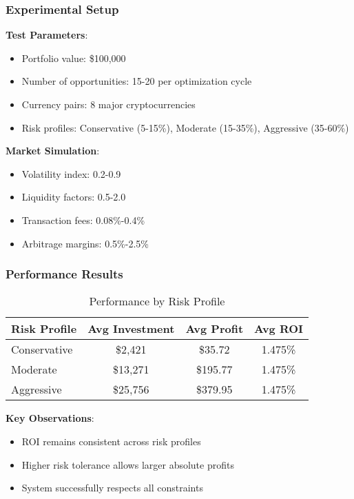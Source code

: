 \documentclass{beamer}
\begin{document}
\begin{frame}
\frametitle{Experimental Setup}
\textbf{Test Parameters}:
\begin{itemize}
    \item Portfolio value: \$100,000
    \item Number of opportunities: 15-20 per optimization cycle
    \item Currency pairs: 8 major cryptocurrencies
    \item Risk profiles: Conservative (5-15\%), Moderate (15-35\%), Aggressive (35-60\%)
\end{itemize}

\vspace{0.5cm}

\textbf{Market Simulation}:
\begin{itemize}
    \item Volatility index: 0.2-0.9
    \item Liquidity factors: 0.5-2.0
    \item Transaction fees: 0.08\%-0.4\%
    \item Arbitrage margins: 0.5\%-2.5\%
\end{itemize}
\end{frame}

\begin{frame}
\frametitle{Performance Results}
\begin{table}[h]
\centering
\begin{tabular}{@{}lccc@{}}
\toprule
Risk Profile & Avg Investment & Avg Profit & Avg ROI \\
\midrule
Conservative & \$2,421 & \$35.72 & 1.475\% \\
Moderate & \$13,271 & \$195.77 & 1.475\% \\
Aggressive & \$25,756 & \$379.95 & 1.475\% \\
\bottomrule
\end{tabular}
\caption{Performance by Risk Profile}
\end{table}

\vspace{0.5cm}

\textbf{Key Observations}:
\begin{itemize}
    \item ROI remains consistent across risk profiles
    \item Higher risk tolerance allows larger absolute profits
    \item System successfully respects all constraints
\end{itemize}
\end{frame}
\end{document}
